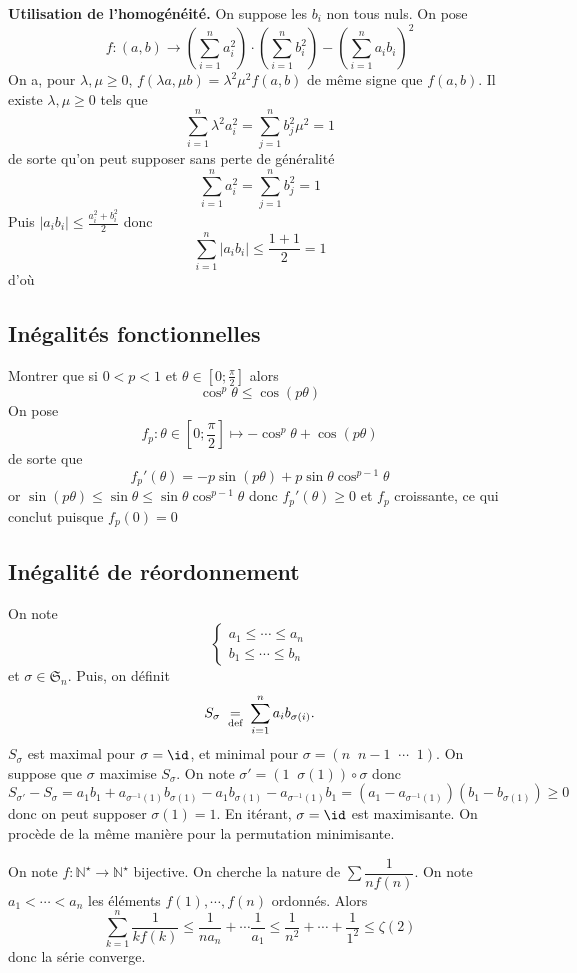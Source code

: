 \textbf{Utilisation de l'homogénéité.} On suppose les $b_i$ non tous nuls. On pose \[
    f:(a, b)\longrightarrow \left( \sum_{i=1}^na_i^2 \right) \cdot \left( \sum_{i=1}^n b_i^2 \right)- \left( \sum_{i=1}^na_ib_i \right)^2
\]
On a, pour $\lambda, \mu\geq 0$, $f(\lambda a, \mu b)=\lambda^2\mu^2f(a, b)$ de même signe que $f(a, b)$. Il existe $\lambda, \mu\geq 0$ tels que \[
    \sum_{i=1}^n \lambda^2a_i^2=\sum_{j=1}^nb_j^2\mu^2=1
\]
de sorte qu'on peut supposer sans perte de généralité \[
    \sum_{i=1}^na_i^2=\sum_{j=1}^n b_j^2=1
\]
Puis $|a_ib_i|\leq \frac{a_i^2+b_i^2}2$ donc \[
    \sum_{i=1}^n|a_ib_i|\leq \frac{1+1}2=1
\]
d'où \conc

\subsection{Inégalités fonctionnelles}

Montrer que si $0<p<1$ et $\theta\in \left[ 0; \frac\pi2 \right]$ alors \[
    \cos^p\theta\leq \cos(p\theta)
\]
On pose \[
    f_p:\theta\in \left[ 0;\frac\pi2 \right]\longmapsto -\cos^p\theta+\cos(p\theta)
\]
de sorte que \[
    f_p'(\theta)=-p\sin(p\theta)+p\sin\theta\cos^{p-1}\theta
\]
or $\sin(p\theta)\leq \sin\theta\leq \sin\theta\cos^{p-1}\theta$ donc $f_p'(\theta)\geq 0$ et $f_p$ croissante, ce qui conclut puisque $f_p(0)=0$

\subsection{Inégalité de réordonnement}

On note \[
    \begin{cases}
        a_1\leq \cdots \leq a_n\\ b_1\leq \cdots \leq b_n
    \end{cases}
\]
et $\sigma\in\mathfrak S_n$. Puis, on définit \[
    S_\sigma\;\underset{\text{def}}=\;\sum_{i=1}^na_ib_{\sigma(i)}.
\]
$S_\sigma$ est maximal pour $\sigma=\id$, et minimal pour $\sigma=(n\;\;n-1\;\;\cdots \;\; 1)$. On suppose que $\sigma$ maximise $S_\sigma$. On note $\sigma'=(1\;\;\sigma(1))\circ \sigma$ donc \[ S_{\sigma'}-S_\sigma=a_1b_1+a_{\sigma^{-1}(1)}b_{\sigma(1)}-a_1b_{\sigma(1)}-a_{\sigma^{-1}(1)}b_1 =(a_1-a_{\sigma^{-1}(1)})(b_1-b_{\sigma(1)})\geq 0\]
donc on peut supposer $\sigma(1)=1$. En itérant, $\sigma=\id$ est maximisante. On procède de la même manière pour la permutation minimisante.

\begin{ex}[Application 1]
    On note $f:\mathbb N^\star\to\mathbb N^\star$ bijective. On cherche la nature de $\sum\dfrac1{nf(n)}$.
    On note $a_1<\cdots <a_n$ les éléments $f(1), \cdots, f(n)$ ordonnés. Alors \[
        \sum_{k=1}^n\frac1{kf(k)}\leq \frac1{na_n}+\cdots \frac1{a_1}\leq \frac1{n^2}+\cdots +\frac1{1^2}\leq\zeta(2)
    \]
    donc la série converge.
\end{ex}

